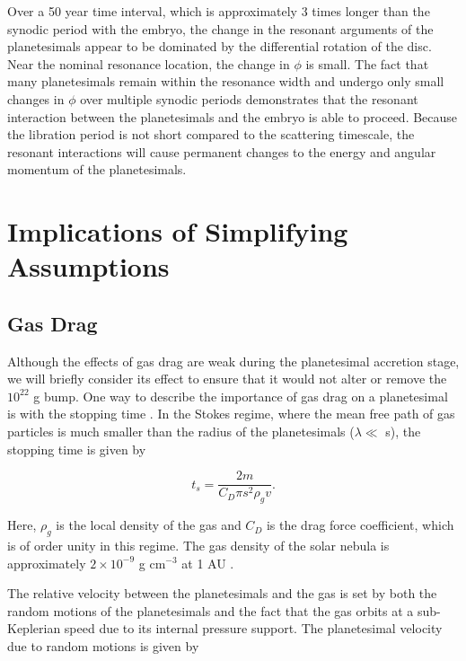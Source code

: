 Over a 50 year time interval, which is approximately 3 times longer than the synodic period with the embryo, the change in the 
resonant arguments of the planetesimals appear to be dominated by the differential rotation of the disc. Near the nominal 
resonance location, the change in $\phi$ is small. The fact that many planetesimals remain within the resonance width and 
undergo only small changes in $\phi$ over multiple synodic periods demonstrates that the resonant interaction between the 
planetesimals and the embryo is able to proceed. Because the libration period is not short compared to the scattering timescale, 
the resonant interactions will cause permanent changes to the energy and angular momentum of the planetesimals.

\section{Implications of Simplifying Assumptions}\label{sec:assumptions}

\subsection{Gas Drag}

Although the effects of gas drag are weak during the planetesimal accretion stage, we will briefly consider its effect to ensure 
that it would not alter or remove the $10^{22}$ g bump. One way to describe the importance of gas drag on a planetesimal is 
with the stopping time \cite{adachi76}. In the Stokes regime, where the mean free path of gas particles is much smaller than the 
radius of the planetesimals ($\lambda \ll$ s), the stopping time is given by

\begin{equation}\label{eq:t_stop}
    t_{s} = \frac{2 m}{C_{D} \pi s^{2} \rho_{g} v}.
\end{equation}

\noindent Here, $\rho_{g}$ is the local density of the gas and $C_{D}$ is the drag force coefficient, which is of order unity in this 
regime. The gas density of the solar nebula is approximately $2 \times 10^{-9}$ g cm$^{-3}$ at 1 AU \cite{hayashi81}.

The relative velocity between the planetesimals and the gas is set by both the random motions of the planetesimals and the fact 
that the gas orbits at a sub-Keplerian speed due to its internal pressure support. The planetesimal velocity due to random 
motions is given by \cite{lissauer93}

